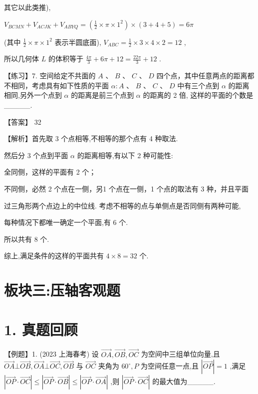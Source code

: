 \documentclass[10pt]{article}
\newcommand*\circled[1]{\tikz[baseline=(char.base)]{\node[shape=circle,draw,inner sep=1.5pt] (char) {\small #1};}}
\begin{document}
其它以此类推),

\({V}_{BCMN} + {V}_{ACJK} + {V}_{ABYQ} = \left( {\frac{1}{2} \times  \pi  \times  {1}^{2}}\right)  \times  \left( {3 + 4 + 5}\right)  = {6\pi }\)

(其中 \(\frac{1}{2} \times  \pi  \times  {1}^{2}\) 表示半圆底面), \({V}_{ABC} = \frac{1}{2} \times  3 \times  4 \times  2 = {12}\) ,

所以几何体 \(L\) 的体积等于 \(\frac{4\pi }{3} + {6\pi } + {12} = \frac{22\pi }{3} + {12}\) .

【练习】7. 空间给定不共面的 \(A\) 、 \(B\) 、 \(C\) 、 \(D\) 四个点，其中任意两点的距离都不相同，考虑具有如下性质的平面 \(\alpha  : A\text{ 、 }B\text{ 、 }C\text{ 、 }D\) 中有三个点到 \(\alpha\) 的距离相同,另外一个点到 \(\alpha\) 的距离是前三个点到 \(\alpha\) 的距离的 2 倍, 这样的平面的个数是\_\_\_\_\_.

【答案】 32

【解析】首先取 3 个点相等,不相等的那个点有 4 种取法.

然后分 3 个点到平面 \(\alpha\) 的距离相等,有以下 2 种可能性:

 \circled{1} 全同侧，这样的平面有 2 个；

 \circled{2} 不同侧，必然 2 个点在一侧，另1 个点在一侧，1 个点的取法有 3 种，并且平面

过三角形两个点边上的中位线. 考虑不相等的点与单侧点是否同侧有两种可能,

每种情况下都唯一确定一个平面,有 6 个.

所以共有 8 个.

综上,满足条件的这样的平面共有 \(4 \times  8 = {32}\) 个.

\section*{板块三:压轴客观题}

\section*{1. 真题回顾}

【例题】1. (2023 上海春考) 设 \(\overrightarrow{OA},\overrightarrow{OB},\overrightarrow{OC}\) 为空间中三组单位向量,且 \(\overrightarrow{OA} \bot  \overrightarrow{OB},\overrightarrow{OA} \bot  \overrightarrow{OC},\overrightarrow{OB}\) 与 \(\overrightarrow{OC}\) 夹角为 \({60}^{ \circ  },P\) 为空间任意一点,且 \(\left| \overrightarrow{OP}\right|  = 1\) ,满足 \(\left| {\overrightarrow{OP} \cdot  \overrightarrow{OC}}\right|  \leq  \left| {\overrightarrow{OP} \cdot  \overrightarrow{OB}}\right|  \leq  \left| {\overrightarrow{OP} \cdot  \overrightarrow{OA}}\right|\) ,则 \(\left| {\overrightarrow{OP} \cdot  \overrightarrow{OC}}\right|\) 的最大值为\_\_\_\_\_.
\end{document}
